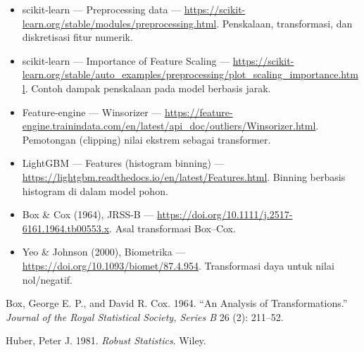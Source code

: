 \begin{bacaan}

\begin{itemize}
\tightlist
\item
  scikit-learn --- Preprocessing data --- \url{https://scikit-learn.org/stable/modules/preprocessing.html}. Penskalaan, transformasi, dan diskretisasi fitur numerik.
\item
  scikit-learn --- Importance of Feature Scaling --- \url{https://scikit-learn.org/stable/auto_examples/preprocessing/plot_scaling_importance.html}. Contoh dampak penskalaan pada model berbasis jarak.
\item
  Feature-engine --- Winsorizer --- \url{https://feature-engine.trainindata.com/en/latest/api_doc/outliers/Winsorizer.html}. Pemotongan (clipping) nilai ekstrem sebagai transformer.
\item
  LightGBM --- Features (histogram binning) --- \url{https://lightgbm.readthedocs.io/en/latest/Features.html}. Binning berbasis histogram di dalam model pohon.
\item
  Box \& Cox (1964), JRSS-B --- \url{https://doi.org/10.1111/j.2517-6161.1964.tb00553.x}. Asal transformasi Box--Cox.
\item
  Yeo \& Johnson (2000), Biometrika --- \url{https://doi.org/10.1093/biomet/87.4.954}. Transformasi daya untuk nilai nol/negatif.
\end{itemize}

\end{bacaan}

\rujukanheading

\protect{}\label{refs}
\begin{CSLReferences}{1}{1}
Box, George E. P., and David R. Cox. 1964. {``An Analysis of Transformations.''} \emph{Journal of the Royal Statistical Society, Series B} 26 (2): 211--52.

Huber, Peter J. 1981. \emph{Robust Statistics}. Wiley.

\end{CSLReferences}
